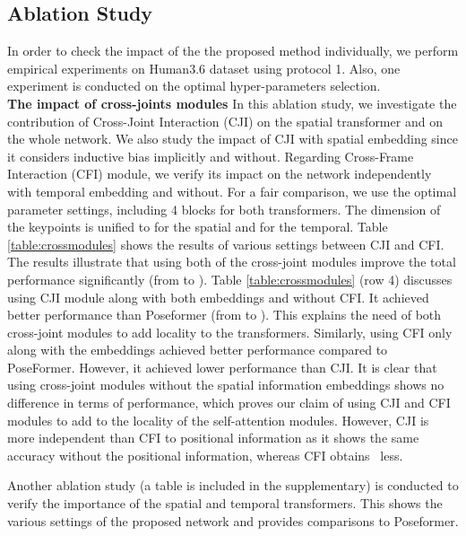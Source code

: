 \documentclass[runningheads]{llncs}
\begin{document}
\subsection{Ablation Study}
In order to check the impact of the the proposed method individually, we perform empirical experiments on Human3.6 dataset using protocol 1. Also, one experiment is conducted on the optimal hyper-parameters selection.\\
\textbf{The impact of cross-joints modules} In this ablation study, we investigate the contribution of Cross-Joint Interaction (CJI) on the spatial transformer and on the whole network. We also study the impact of CJI with spatial embedding since it considers inductive bias implicitly and without. Regarding Cross-Frame Interaction (CFI) module, we verify its impact on the network independently with temporal embedding and without. For a fair comparison, we use the optimal parameter settings, including 4 blocks for both transformers. The dimension of the keypoints is unified to  for the spatial and  for the temporal. Table \ref{table:crossmodules} shows the results of various settings between CJI and CFI. The results illustrate that using both of the cross-joint modules improve the total performance significantly (from  to ). Table \ref{table:crossmodules} (row 4) discusses using CJI module along with both embeddings and without CFI. It achieved better performance than Poseformer (from  to ). This explains the need of both cross-joint modules to add locality to the transformers. Similarly, using CFI only along with the embeddings achieved better performance compared to PoseFormer. However, it achieved lower performance than CJI. It is clear that using cross-joint modules without the spatial information embeddings shows no difference in terms of performance, which proves our claim of using CJI and CFI modules to add to the locality of the self-attention modules. However, CJI is more independent than CFI to positional information as it shows the same accuracy without the positional information, whereas CFI obtains ~less.

Another ablation study (a table is included in the supplementary) is conducted to verify the importance of the spatial and temporal transformers. This shows the various settings of the proposed network and provides comparisons to Poseformer.
\end{document}

